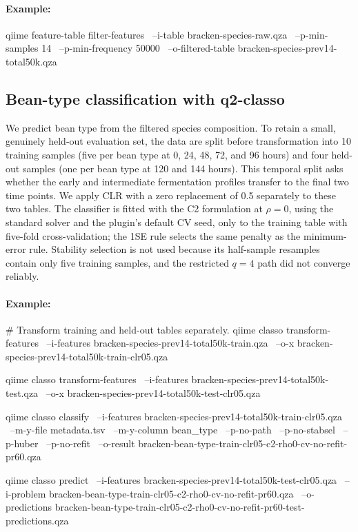 \documentclass[11pt,a4paper]{article}
\newcommand{\pkg}[1]{\textbf{#1}}
\begin{document}
\paragraph{Example:} \mbox{}
\begin{PseudoCode}
qiime feature-table filter-features \
    --i-table bracken-species-raw.qza \
    --p-min-samples 14 \
    --p-min-frequency 50000 \
    --o-filtered-table bracken-species-prev14-total50k.qza
\end{PseudoCode}

\subsection{Bean-type classification with \pkg{q2-classo}}
\label{sec:moshpit-classification}

We predict bean type from the filtered species composition. To retain a small,
genuinely held-out evaluation set, the data are split before transformation into
10 training samples (five per bean type at 0, 24, 48, 72, and 96 hours) and
four held-out samples (one per bean type at 120 and 144 hours). This temporal
split asks whether the early and intermediate fermentation profiles transfer to
the final two time points. We apply CLR with a zero replacement of 0.5
separately to these two tables. The classifier is
fitted with the C2 formulation at $\rho=0$, using the standard solver and
the plugin's default CV seed, only to the training table with five-fold
cross-validation; the 1SE rule
selects the same penalty as the minimum-error rule. Stability selection is not
used because its half-sample resamples contain only five training samples, and
the restricted $q=4$ path did not converge reliably.

\paragraph{Example:} \mbox{}
\begin{PseudoCode}
# Transform training and held-out tables separately.
qiime classo transform-features \
    --i-features bracken-species-prev14-total50k-train.qza \
    --o-x bracken-species-prev14-total50k-train-clr05.qza

qiime classo transform-features \
    --i-features bracken-species-prev14-total50k-test.qza \
    --o-x bracken-species-prev14-total50k-test-clr05.qza

qiime classo classify \
    --i-features bracken-species-prev14-total50k-train-clr05.qza \
    --m-y-file metadata.tsv \
    --m-y-column bean_type \
    --p-no-path \
    --p-no-stabsel \
    --p-huber \
    --p-no-refit \
    --o-result bracken-bean-type-train-clr05-c2-rho0-cv-no-refit-pr60.qza

qiime classo predict \
    --i-features bracken-species-prev14-total50k-test-clr05.qza \
    --i-problem bracken-bean-type-train-clr05-c2-rho0-cv-no-refit-pr60.qza \
    --o-predictions bracken-bean-type-train-clr05-c2-rho0-cv-no-refit-pr60-test-predictions.qza
\end{PseudoCode}
\end{document}
